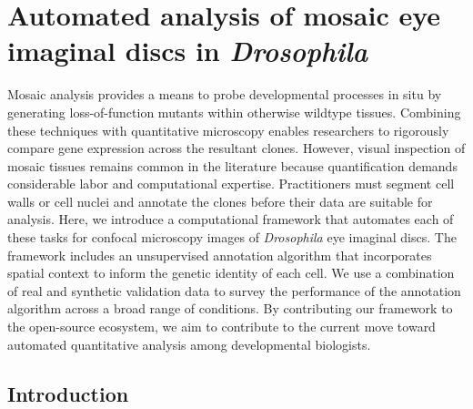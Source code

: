 
\graphicspath{ {./figures/} }


\chapter{Automated analysis of mosaic eye imaginal discs in \textit{Drosophila}}



Mosaic analysis provides a means to probe developmental processes in situ by generating loss-of-function mutants within otherwise wildtype tissues. Combining these techniques with quantitative microscopy enables researchers to rigorously compare gene expression across the resultant clones. However, visual inspection of mosaic tissues remains common in the literature because quantification demands considerable labor and computational expertise. Practitioners must segment cell walls or cell nuclei and annotate the clones before their data are suitable for analysis. Here, we introduce a computational framework that automates each of these tasks for confocal microscopy images of \textit{Drosophila} eye imaginal discs. The framework includes an unsupervised annotation algorithm that incorporates spatial context to inform the genetic identity of each cell. We use a combination of real and synthetic validation data to survey the performance of the annotation algorithm across a broad range of conditions. By contributing our framework to the open-source ecosystem, we aim to contribute to the current move toward automated quantitative analysis among developmental biologists.



\section{Introduction}

